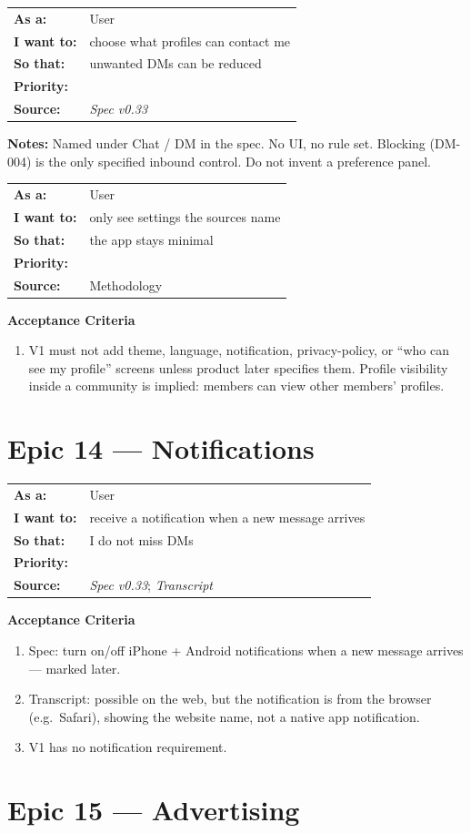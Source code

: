 \documentclass[11pt,a4paper]{article}
\makeatletter
\newcommand{\priPzero}{\colorbox{p0}{\makebox[4.6em]{\textcolor{white}{\scriptsize\bfseries P0 V1}}}}
\newcommand{\priPtwo}{\colorbox{p2}{\makebox[4.6em]{\textcolor{white}{\scriptsize\bfseries P2 Later}}}}
\newcommand{\priTBD}{\colorbox{tbd}{\makebox[4.6em]{\textcolor{white}{\scriptsize\bfseries TBD}}}}
\newcommand{\srcSpec}{\textit{Spec v0.33}}
\newcommand{\srcTx}{\textit{Transcript}}
\newenvironment{story}[1]{%
  \Needspace{10\baselineskip}%
  \vspace{0.7em}%
  \noindent
  \colorbox{navy}{\makebox[\dimexpr\textwidth-2\fboxsep\relax][l]{\textcolor{white}{\bfseries\ #1}}}%
  \par\vspace{0.35em}%
}{\par\vspace{0.55em}}
\newcommand{\storymeta}[5]{%
  \noindent
  \begin{tabularx}{\textwidth}{@{}>{\bfseries}l X@{}}
    As a: & #1 \\
    I want to: & #2 \\
    So that: & #3 \\
    Priority: & #4 \\
    Source: & #5 \\
  \end{tabularx}
  \par\vspace{0.3em}
}
\newcommand{\achead}{\noindent\textbf{Acceptance Criteria}\par}
\newcommand{\notes}[1]{\noindent\textbf{Notes:} #1\par}
\makeatother
\begin{document}
\begin{story}{SET-002 --- Inbound DM contact rules}
\storymeta{User}{choose what profiles can contact me}{unwanted DMs can be reduced}{\priTBD}{\srcSpec}
\notes{Named under Chat / DM in the spec. No UI, no rule set. Blocking (DM-004) is the only specified inbound control. Do not invent a preference panel.}
\end{story}

\begin{story}{SET-003 --- No additional user settings invented}
\storymeta{User}{only see settings the sources name}{the app stays minimal}{\priPzero}{Methodology}
\achead
\begin{enumerate}
  \item V1 must not add theme, language, notification, privacy-policy, or ``who can see my profile'' screens unless product later specifies them. Profile visibility inside a community is implied: members can view other members' profiles.
\end{enumerate}
\end{story}

\section{Epic 14 --- Notifications}

\begin{story}{NOTIF-001 --- Browser notifications later}
\storymeta{User}{receive a notification when a new message arrives}{I do not miss DMs}{\priPtwo}{\srcSpec; \srcTx}
\achead
\begin{enumerate}
  \item Spec: turn on/off iPhone + Android notifications when a new message arrives --- marked later.
  \item Transcript: possible on the web, but the notification is from the browser (e.g.\ Safari), showing the website name, not a native app notification.
  \item V1 has no notification requirement.
\end{enumerate}
\end{story}

\section{Epic 15 --- Advertising}
\end{document}
